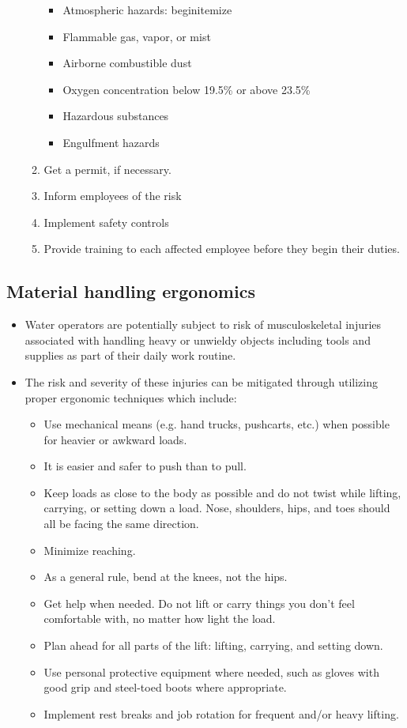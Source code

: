 \begin{itemize}
\begin{enumerate}
\begin{itemize}
\item Atmospheric hazards:
begin{itemize}
\item Flammable gas, vapor, or mist
\item Airborne combustible dust
\item Oxygen concentration below 19.5\% or above 23.5\%
\item Hazardous substances 
\item Engulfment hazards 
\end{itemize}
\item Get a permit, if necessary.
\item Inform employees of the risk
\item Implement safety controls
\item Provide training to each affected employee before they begin their duties.
\end{enumerate}
\end{itemize}
\subsection{Material handling ergonomics}
\begin{itemize}
\item Water operators are potentially subject to risk of musculoskeletal injuries associated with handling heavy or unwieldy objects including tools and supplies as part of their daily work routine.
\item The risk and severity of these injuries can be mitigated through utilizing proper ergonomic techniques which include:
\begin{itemize}
\item Use mechanical means (e.g. hand trucks, pushcarts, etc.) when possible for heavier or awkward loads.
\item It is easier and safer to push than to pull.
\item Keep loads as close to the body as possible and do not twist while lifting, carrying, or setting down a load. Nose, shoulders, hips, and toes should all be facing the same direction.
\item Minimize reaching.
\item As a general rule, bend at the knees, not the hips.
\item Get help when needed. Do not lift or carry things you don’t feel comfortable with, no matter how light the load.
\item Plan ahead for all parts of the lift: lifting, carrying, and setting down.
\item Use personal protective equipment where needed, such as gloves with good grip and steel-toed boots where appropriate.
\item Implement rest breaks and job rotation for frequent and/or heavy lifting.
\end{itemize}
\end{itemize}